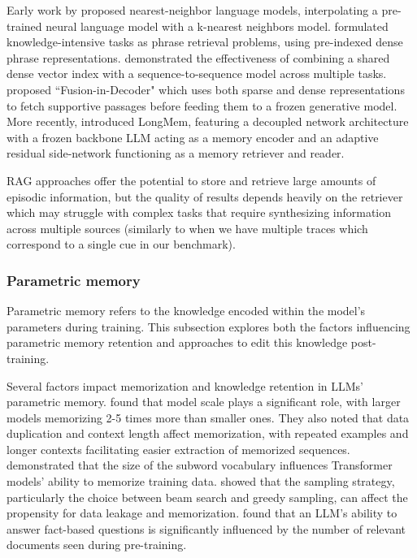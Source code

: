 \documentclass{article}
\begin{document}
Early work by \citet{Khandelwal2019} proposed nearest-neighbor language models, interpolating a pre-trained neural language model with a k-nearest neighbors model. \citet{Lee2020} formulated knowledge-intensive tasks as phrase retrieval problems, using pre-indexed dense phrase representations. \citet{Petroni2020} demonstrated the effectiveness of combining a shared dense vector index with a sequence-to-sequence model across multiple tasks.  \citet{Izacard2020} proposed ``Fusion-in-Decoder" which uses both sparse and dense representations to fetch supportive passages before feeding them to a frozen generative model. More recently, \citet{Wang2023-a} introduced LongMem, featuring a decoupled network architecture with a frozen backbone LLM acting as a memory encoder and an adaptive residual side-network functioning as a memory retriever and reader.

RAG approaches offer the potential to store and retrieve large amounts of episodic information, but the quality of results depends heavily on the retriever which may struggle with complex tasks that require synthesizing information across multiple sources (similarly to when we have multiple traces which correspond to a single cue in our benchmark).

\subsubsection{Parametric memory}
Parametric memory refers to the knowledge encoded within the model's parameters during training. This subsection explores both the factors influencing parametric memory retention and approaches to edit this knowledge post-training.

Several factors impact memorization and knowledge retention in LLMs' parametric memory. \citet{Carlini2022} found that model scale plays a significant role, with larger models memorizing 2-5 times more than smaller ones. They also noted that data duplication and context length affect memorization, with repeated examples and longer contexts facilitating easier extraction of memorized sequences. \citet{Kharitonov2021} demonstrated that the size of the subword vocabulary influences Transformer models' ability to memorize training data. \citet{Carlini2019} showed that the sampling strategy, particularly the choice between beam search and greedy sampling, can affect the propensity for data leakage and memorization. \citet{Kandpal2022} found that an LLM's ability to answer fact-based questions is significantly influenced by the number of relevant documents seen during pre-training.
\end{document}

